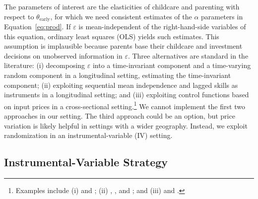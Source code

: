 The parameters of interest are the elasticities of childcare and parenting with respect to $ \theta_{\text{early}}$, for which we need consistent estimates of the $\alpha$ parameters in Equation~\eqref{eq:prod}. If $\varepsilon$ is mean-independent of the right-hand-side variables of this equation, ordinary least squares (OLS) yields such estimates. This assumption is implausible because parents base their childcare and investment decisions on unobserved information in $\varepsilon$. Three alternatives are standard in the literature: (i) decomposing $\varepsilon$ into a time-invariant component and a time-varying random component in a longitudinal setting, estimating the time-invariant component; (ii) exploiting sequential mean independence and lagged skills as instruments in a longitudinal setting; and (iii) exploiting control functions based on input prices in a cross-sectional setting.\footnote{Examples include (i) \citet{cunhaEstimatingTechnologyCognitive2010a} and \citet{pavanProductionSkillsBirthOrder2016}; (ii) \citet{delbonoIdentificationDynamicLatent2022}, \citet{agostinelliEstimatingTechnologyChildren2016a}, and \citet{cunhaEstimatingTechnologyCognitive2010a}; and (iii) \citet{attanasioHumanCapitalDevelopment2020a} and \citet{attanasioEstimatingProductionFunction2020b}.} We cannot implement the first two approaches in our setting. The third approach could be an option, but price variation is likely helpful in settings with a wider geography. Instead, we exploit randomization in an instrumental-variable (IV) setting.

\subsection{ Instrumental-Variable Strategy} \label{section:iv}

